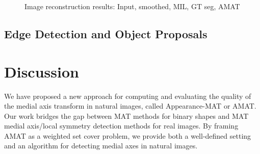 \documentclass[10pt,twocolumn,letterpaper]{article}
\begin{document}
\begin{figure}[t]
\centering
\caption{Image reconstruction results: Input, smoothed, MIL, GT seg, AMAT}
\label{fig:reconstruction}
\end{figure}


\subsection{Edge Detection and Object Proposals}\label{sec:experiments:edge}




\section{Discussion}\label{sec:discussion}
We have proposed a new approach for computing and evaluating the quality of the medial axis transform in 
natural images, called Appearance-MAT or AMAT.
Our work bridges the gap between MAT methods for binary shapes and MAT medial axis/local symmetry detection methods
for real images.
By framing AMAT as a weighted set cover problem, we provide both a well-defined setting and an algorithm for 
detecting medial axes in natural images.



{\small


}
\end{document}
